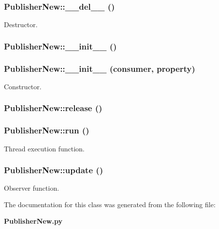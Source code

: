 \subsubsection{\setlength{\rightskip}{0pt plus 5cm}Publisher\-New::\_\-\_\-del\_\-\_\- ()}\label{classPublisherNew_PublisherNewa1}


Destructor. 

\subsubsection{\setlength{\rightskip}{0pt plus 5cm}Publisher\-New::\_\-\_\-init\_\-\_\- ()}\label{classPublisherNew_PublisherNewa5}


\subsubsection{\setlength{\rightskip}{0pt plus 5cm}Publisher\-New::\_\-\_\-init\_\-\_\- (consumer, property)}\label{classPublisherNew_PublisherNewa0}


Constructor. 

\subsubsection{\setlength{\rightskip}{0pt plus 5cm}Publisher\-New::release ()}\label{classPublisherNew_PublisherNewa4}


\subsubsection{\setlength{\rightskip}{0pt plus 5cm}Publisher\-New::run ()}\label{classPublisherNew_PublisherNewa3}


Thread execution function. 

\subsubsection{\setlength{\rightskip}{0pt plus 5cm}Publisher\-New::update ()}\label{classPublisherNew_PublisherNewa2}


Observer function. 



The documentation for this class was generated from the following file:\begin{CompactItemize}
\item 
{\bf Publisher\-New.py}\end{CompactItemize}
